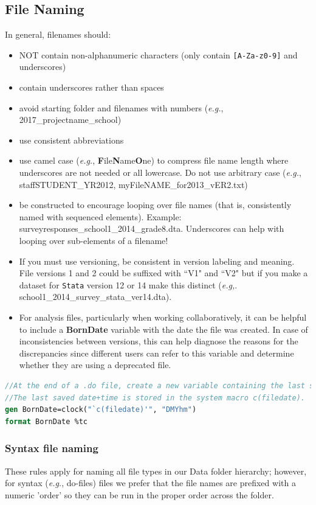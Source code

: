 \subsection{File Naming}
In general, filenames should:
\begin{itemize}
	\item NOT contain non-alphanumeric characters (only contain \texttt{[A-Za-z0-9]} and underscores)
	\item contain underscores rather than spaces
	\item avoid starting folder and filenames with numbers (\textit{e.g.},  2017\_projectname\_school)
	\item use consistent abbreviations
	\item use camel case ({\it{e.g.}}, \textbf{F}ile\textbf{N}ame\textbf{O}ne) to compress file name length where underscores are not needed or all lowercase. Do not use arbitrary case (\textit{e.g.},  staffSTUDENT\_YR2012, myFileNAME\_for2013\_vER2.txt)
	\item be constructed to encourage looping over file names (that is, consistently named with sequenced elements). Example:  surveyresponses\_school1\_2014\_grade8.dta.   Underscores can help with looping over sub-elements of a filename!
	\item If you must use versioning, be consistent in version labeling and meaning.  File versions 1 and 2 could be suffixed with ``V1" and ``V2" but if you make a dataset for \texttt{Stata} version 12 or 14 make this distinct (\textit{e.g,}. school1\_2014\_survey\_stata\_ver14.dta).
	\item For analysis files, particularly when working collaboratively, it can be helpful to include a \textbf{BornDate} variable with the date the file was created. In case of inconsistencies between versions, this can help diagnose the reasons for the discrepancies since different users can refer to this variable and determine whether they are using a deprecated file. 
\end{itemize}
\begin{lstlisting}[language=Stata, numbers=none]
//At the end of a .do file, create a new variable containing the last saved date/time of the file.
//The last saved date+time is stored in the system macro c(filedate).
gen BornDate=clock("`c(filedate)'", "DMYhm")
format BornDate %tc
\end{lstlisting}

\subsubsection{Syntax file naming}
These rules apply for naming all file types in our Data folder hierarchy; however, for syntax ({\it{e.g.}}, do-files) files we prefer that the file names are prefixed with a numeric 'order' so they can be run in the proper order across the folder.

